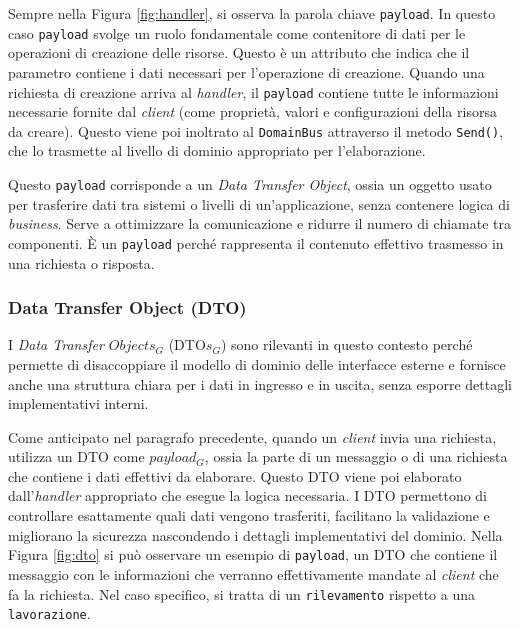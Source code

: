             \vspace{0.2 em}
            \noindent Sempre nella Figura \ref{fig:handler}, si osserva la parola chiave \texttt{payload}. In questo caso \texttt{payload} svolge un ruolo fondamentale come contenitore di dati per le operazioni di creazione delle risorse. Questo è un attributo che indica che il parametro contiene i dati necessari per l'operazione di creazione. Quando una richiesta di creazione arriva al \textit{handler}, il \texttt{payload} contiene tutte le informazioni necessarie fornite dal \textit{client} (come proprietà, valori e configurazioni della risorsa da creare). Questo viene poi inoltrato al \texttt{DomainBus} attraverso il metodo \texttt{Send()}, che lo trasmette al livello di dominio appropriato per l'elaborazione. 

            \vspace{0.2 em}
            \noindent Questo \texttt{payload} corrisponde a un \textit{Data Transfer Object}, ossia un oggetto usato per trasferire dati tra sistemi o livelli di un'applicazione, senza contenere logica di \textit{business}. Serve a ottimizzare la comunicazione e ridurre il numero di chiamate tra componenti. È un \texttt{payload} perché rappresenta il contenuto effettivo trasmesso in una richiesta o risposta. 

            
            \subsubsection{Data Transfer Object (DTO)}
            I \textit{Data Transfer $Objects_G$ } (DTO$s_G$) sono rilevanti in questo contesto perché permette di disaccoppiare il modello di dominio delle interfacce esterne e fornisce anche una struttura chiara per i dati in ingresso e in uscita, senza esporre dettagli implementativi interni. 

            \vspace{0.2 em}
            \noindent Come anticipato nel paragrafo precedente, quando un \textit{client} invia una richiesta, utilizza un DTO come \textbf{$payload_G$}, ossia la parte di un messaggio o di una richiesta che contiene i dati effettivi da elaborare. Questo DTO viene poi elaborato dall'\textit{handler} appropriato che esegue la logica necessaria. I DTO permettono di controllare esattamente quali dati vengono trasferiti, facilitano la validazione e migliorano la sicurezza nascondendo i dettagli implementativi del dominio. Nella Figura \ref{fig:dto} si può osservare un esempio di \texttt{payload}, un DTO che contiene il messaggio con le informazioni che verranno effettivamente mandate al \textit{client} che fa la richiesta. Nel caso specifico, si tratta di un \texttt{rilevamento} rispetto a una \texttt{lavorazione}. 

